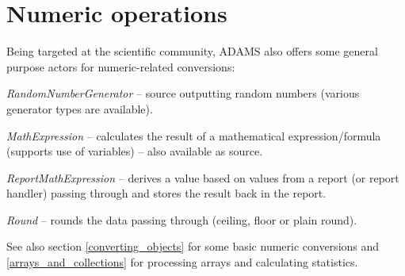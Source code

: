 \newpage
\section{Numeric operations}
\label{numeric_operations}
Being targeted at the scientific community, ADAMS also offers some general
purpose actors for numeric-related conversions:
\begin{tight_itemize}
	\item \textit{RandomNumberGenerator} -- source outputting random numbers
	(various generator types are available).
	\item \textit{MathExpression} -- calculates the result of a mathematical
	expression/formula (supports use of variables) -- also available as source.
	\item \textit{ReportMathExpression} -- derives a value based on values from a
	report (or report handler) passing through and stores the result back in the
	report.
	\item \textit{Round} -- rounds the data passing through (ceiling, floor or
	plain round).
\end{tight_itemize}
See also section \ref{converting_objects} for some basic numeric conversions
and \ref{arrays_and_collections} for processing arrays and calculating
statistics.

\newpage
